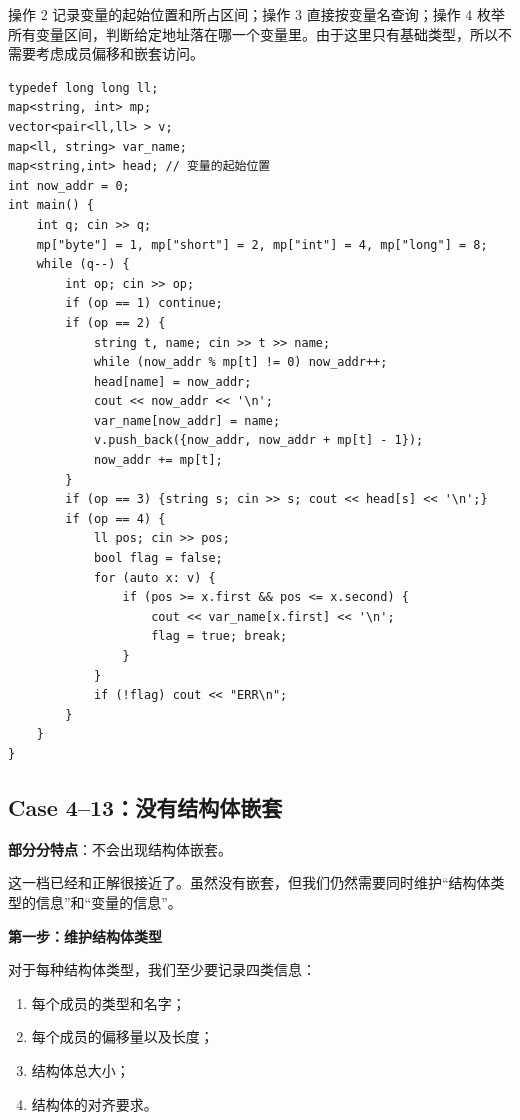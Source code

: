 \documentclass{book}
\begin{document}
        操作 $2$ 记录变量的起始位置和所占区间；操作 $3$ 直接按变量名查询；操作 $4$ 枚举所有变量区间，判断给定地址落在哪一个变量里。由于这里只有基础类型，所以不需要考虑成员偏移和嵌套访问。
        \begin{lstlisting}[style = code]
typedef long long ll;
map<string, int> mp;
vector<pair<ll,ll> > v;
map<ll, string> var_name;
map<string,int> head; // 变量的起始位置
int now_addr = 0;
int main() {
    int q; cin >> q;
    mp["byte"] = 1, mp["short"] = 2, mp["int"] = 4, mp["long"] = 8;
    while (q--) {
        int op; cin >> op;
        if (op == 1) continue;
        if (op == 2) {
            string t, name; cin >> t >> name;
            while (now_addr % mp[t] != 0) now_addr++;
            head[name] = now_addr;
            cout << now_addr << '\n';
            var_name[now_addr] = name;
            v.push_back({now_addr, now_addr + mp[t] - 1});
            now_addr += mp[t];
        }
        if (op == 3) {string s; cin >> s; cout << head[s] << '\n';}
        if (op == 4) {
            ll pos; cin >> pos;
            bool flag = false;
            for (auto x: v) {
                if (pos >= x.first && pos <= x.second) {
                    cout << var_name[x.first] << '\n';
                    flag = true; break;
                }
            }
            if (!flag) cout << "ERR\n";
        }
    }
}\end{lstlisting}
        
    
    \subsection{Case 4--13：没有结构体嵌套}
    \textbf{部分分特点}：不会出现结构体嵌套。

    这一档已经和正解很接近了。虽然没有嵌套，但我们仍然需要同时维护“结构体类型的信息”和“变量的信息”。

    \par\medskip
    \noindent\textbf{第一步：维护结构体类型}
    \par\medskip

    对于每种结构体类型，我们至少要记录四类信息：

    \begin{enumerate}[leftmargin=2em,itemsep=1pt,topsep=2pt,parsep=0pt,partopsep=0pt]
        \item 每个成员的类型和名字；
        \item 每个成员的偏移量以及长度；
        \item 结构体总大小；
        \item 结构体的对齐要求。
    \end{enumerate}
\end{document}
